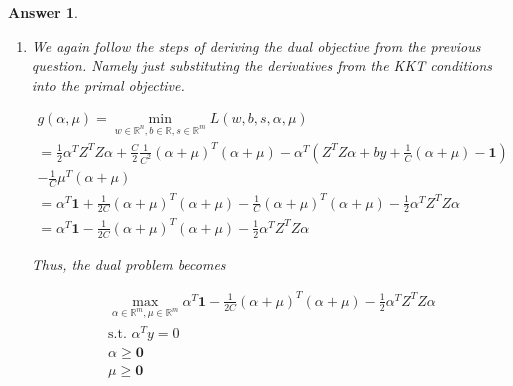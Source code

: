 \documentclass[12pt]{article}
\theoremstyle{colon}
\newtheorem*{answer}{Answer}
\begin{document}
\begin{answer}
\begin{enumerate}[label=\alph*)]
    \item We again follow the steps of deriving the dual objective from the previous question. Namely just substituting the derivatives from the KKT conditions into the primal objective.

      \begin{gather*}
        g(\alpha, \mu) = \min_{w \in \mathbb{R}^n, b \in \mathbb{R}, s \in \mathbb{R}^m} L(w, b, s, \alpha, \mu) \\
        = \frac{1}{2} \alpha^T Z^T Z \alpha + \frac{C}{2} \frac{1}{C^2}(\alpha + \mu)^T (\alpha + \mu) - \alpha^T (Z^T Z \alpha + b y + \frac{1}{C}(\alpha + \mu) - \bm{1}) \\
        - \frac{1}{C} \mu^T (\alpha + \mu) \\
        = \alpha^T \bm{1} + \frac{1}{2C}(\alpha + \mu)^T (\alpha + \mu) - \frac{1}{C} (\alpha + \mu)^T (\alpha + \mu) - \frac{1}{2} \alpha^T Z^T Z \alpha \\
        = \alpha^T \bm{1} - \frac{1}{2C} (\alpha + \mu)^T (\alpha + \mu) - \frac{1}{2} \alpha^T Z^T Z \alpha
      \end{gather*}

      Thus, the dual problem becomes

      \begin{gather*}
        \max_{\alpha \in \mathbb{R}^m, \mu \in \mathbb{R}^m} \alpha^T \bm{1} - \frac{1}{2C} (\alpha + \mu)^T (\alpha + \mu) - \frac{1}{2} \alpha^T Z^T Z \alpha \\
        \text{s.t. } \alpha^T y = 0 \\
        \alpha \geq \bm{0} \\
        \mu \geq \bm{0}
      \end{gather*}
  \end{enumerate}
\end{answer}

\clearpage
\end{document}
